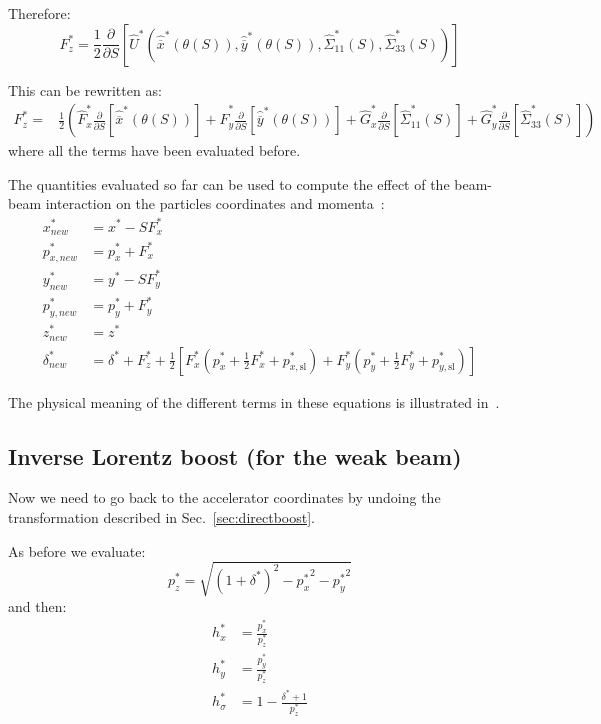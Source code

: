 Therefore:
\begin{equation}
F^*_z  =  \frac{1}{2}\frac{\partial }{\partial S} \left[
\hat{U}^*\left(\hat{\overline{x}}^*\left(\theta (S)\right), \hat{\overline{y}}^*\left(\theta (S)\right) , \hat{\Sigma}^*_{11}(S), \hat{\Sigma}^*_{33}(S)\right) 
\right]
\end{equation}

This can be rewritten as:
\begin{align}
F^*_z  =  &\frac{1}{2}\left(
\hat{F}^*_x \frac{\partial }{\partial S} \left[\hat{\overline{x}}^*\left(\theta (S)\right) \right]+
\hat{F}^*_y \frac{\partial }{\partial S} \left[\hat{\overline{y}}^*\left(\theta (S)\right) \right]+
\hat{G}^*_x\frac{\partial }{\partial S} \left[\hat{\Sigma}^*_{11}(S)\right]+
\hat{G}^*_y\frac{\partial }{\partial S} \left[\hat{\Sigma}^*_{33}(S)\right]\right)
\end{align}
where all the terms have been evaluated before.

The quantities evaluated so far can be used to compute the effect of the beam-beam interaction on the particles coordinates and momenta~\cite{hirata}:
\begin{align}
x^*_{new} &= x^* - S {F}^*_x\\
p^*_{x, new} &= p^*_{x} + {F}^*_x\\
y^*_{new} &= y^* - S {F}^*_y\\
p^*_{y, new} &= p^*_{y} + {F}^*_y\\
z^*_{new} &= z^*\\
\delta^*_{new} &= \delta^* + {F}^*_z
+\frac{1}{2}\left[ 
{F}^*_x\left(p^*_{x} + \frac{1}{2}{F}^*_x + p^*_{x,\textrm{sl}}\right)+
{F}^*_y\left(p^*_{y} + \frac{1}{2}{F}^*_y + p^*_{y,\textrm{sl}}\right)
\right]
\end{align}

The physical meaning of the different terms in these equations is illustrated in~\cite{bb6dslides}.

\subsection{Inverse Lorentz boost (for the weak beam)}

Now we need to go back to the accelerator coordinates by undoing the transformation described in Sec.~\ref{sec:directboost}.

As before we evaluate:
\begin{equation}
p^*_z  =  \sqrt{\left(1+\delta^*\right)^2-{p_x^*}^2-{p_y^*}^2}
\end{equation}
and then:
\begin{align}
h^*_x &= \frac{p^*_x}{p^*_z}\\
h^*_y &= \frac{p^*_y}{p^*_z}\\
h^*_\sigma &= 1-\frac{\delta^*+1}{p^*_z}
\end{align}

